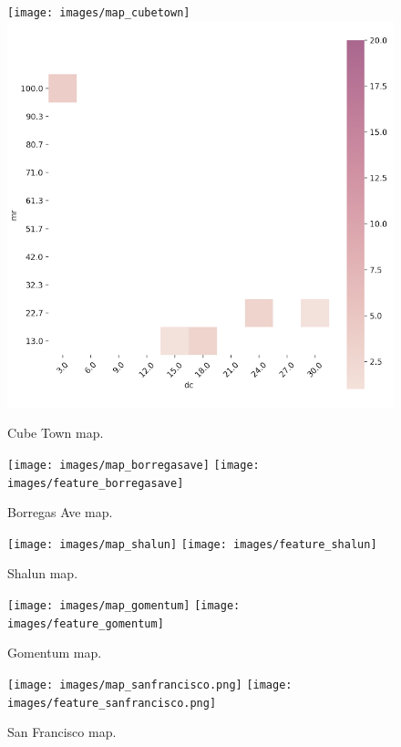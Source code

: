 \documentclass[conference]{IEEEtran}
\begin{document}
\begin{figure}[!tp]
  \texttt{[image: images/map\_cubetown]}
  \includegraphics[width=\linewidth]{images/feature_cubetown}
  \caption{Cube Town map.}
  \label{fig:feature-maps-cubetown}
\endminipage\hfill
{}
  \texttt{[image: images/map\_borregasave]}
  \texttt{[image: images/feature\_borregasave]}
  \caption{Borregas Ave map.}
    \label{fig:feature-maps-borregas}
\endminipage\hfill
{}%
  \texttt{[image: images/map\_shalun]}
  \texttt{[image: images/feature\_shalun]}
  \caption{Shalun map.}
    \label{fig:feature-maps-shalun}
\endminipage 
\end{figure}

\begin{figure}[!tp]
\hfill
{}%
  \texttt{[image: images/map\_gomentum]}
  \texttt{[image: images/feature\_gomentum]}
  \caption{Gomentum map.}
    \label{fig:feature-maps-gomentum}
\endminipage\hfill
{}%
  \texttt{[image: images/map\_sanfrancisco.png]}
  \texttt{[image: images/feature\_sanfrancisco.png]}
  \caption{San Francisco map.}
    \label{fig:feature-maps-sanfrancisco}
\endminipage
\hfill
\end{figure}
\end{document}
